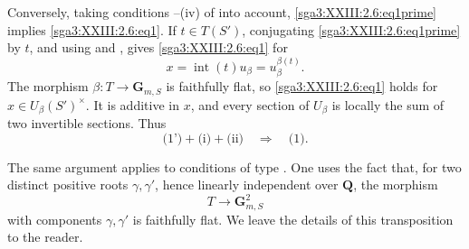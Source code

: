 Conversely, taking conditions --(iv) of  into account,
\eqref{sga3:XXIII:2.6:eq1prime} implies
\eqref{sga3:XXIII:2.6:eq1}. If \(t\in T(S')\), conjugating
\eqref{sga3:XXIII:2.6:eq1prime} by \(t\), and using  and ,
gives \eqref{sga3:XXIII:2.6:eq1} for
\[
  x=\operatorname{int}(t)u_\beta=u_\beta^{\beta(t)}.
\]
The morphism \(\beta:T\to\mathbf G_{m,S}\) is faithfully flat, so
\eqref{sga3:XXIII:2.6:eq1} holds for
\(x\in U_\beta(S')^\times\). It is additive in \(x\), and every
section of \(U_\beta\) is locally the sum of two invertible sections.
Thus
\[
  \text{(1')}+\text{(i)}+\text{(ii)}
    \quad\Longrightarrow\quad\text{(1)}.
\]

The same argument applies to conditions of type . One uses the
fact that, for two distinct positive roots \(\gamma,\gamma'\), hence
linearly independent over \(\mathbf Q\), the morphism
\[
  T\longrightarrow\mathbf G_{m,S}^2
\]
with components \(\gamma,\gamma'\) is faithfully flat. We leave the
details of this transposition to the reader.


